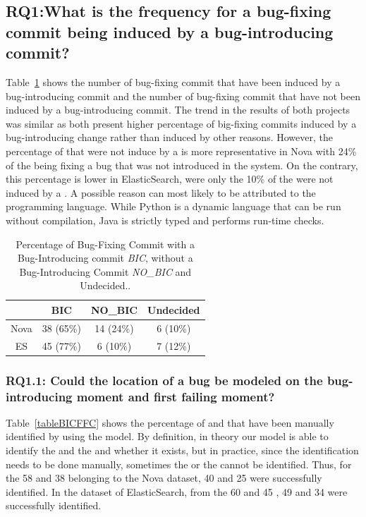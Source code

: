 \documentclass[a4paper, 12pt]{book}
\begin{document}
\subsection{ RQ1:What is the frequency for a bug-fixing commit being induced by a bug-introducing commit?}
Table~\ref{tableBugNoBug} shows the number of bug-fixing commit that have been induced by a bug-introducing commit and the number of bug-fixing commit that have not been induced by a bug-introducing commit. The trend in the results of both projects was similar as both present higher percentage of big-fixing commits induced by a bug-introducing change rather than induced by other reasons. However, the percentage of \BFC that were not induce by a \BIC is more representative in Nova with 24\% of the \BFC being fixing a bug that was not introduced in the system. On the contrary, this percentage is lower in ElasticSearch, were only the 10\% of the \BFC were not induced by a \BIC. A possible reason can most likely to be attributed to the programming language. While Python is a dynamic language that can be run without compilation, Java is strictly typed and performs run-time checks. 
\begin{table}[!t]
	\renewcommand{\arraystretch}{1.3}
	\caption{Percentage of Bug-Fixing Commit with a Bug-Introducing commit \emph{BIC}, without a Bug-Introducing Commit \emph{NO\_BIC} and Undecided..}
	\label{tableBugNoBug}
	\centering
	\begin{tabular}{|c|c|c|c| }
		\hline
  		&  BIC & NO\_BIC & Undecided \\
		\hline
		\hline
		Nova & 38 (65\%) & 14 (24\%) & 6 (10\%)\\
		\hline
		ES & 45 (77\%) &  6 (10\%) & 7 (12\%)\\
		\hline
	\end{tabular}
\end{table}

\subsubsection{RQ1.1: Could the location of a bug be modeled on the bug-introducing moment and first failing moment?}

Table~\ref{tableBICFFC} shows the percentage of \BIC and \FFC that have been manually identified by using the model. By definition, in theory our model is able to identify the \FFC and the \BIC and whether it exists, but in practice, since the identification needs to be done manually, sometimes the \BIC or the \FFC cannot be identified. Thus, for the 58 \FFC and 38 \BIC belonging to the Nova dataset, 40 \FFC and 25 \BIC were successfully identified.
In the dataset of ElasticSearch, from the 60 \FFC and 45 \BIC, 49 \FFC and 34 \BIC were successfully identified.
\end{document}
